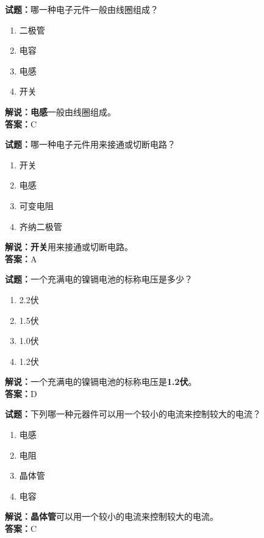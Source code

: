 \documentclass{ctexbook}
\begin{document}
\vspace{1em}

\textbf{试题：}哪一种电子元件一般由线圈组成？
\begin{enumerate}[leftmargin=3em]
  \item 二极管
  \item 电容
  \item 电感
  \item 开关
\end{enumerate}
\noindent\textbf{解说：}\textbf{电感}一般由线圈组成。\\\noindent\textbf{答案：}C

\vspace{1em}

\textbf{试题：}哪一种电子元件用来接通或切断电路？
\begin{enumerate}[leftmargin=3em]
  \item 开关
  \item 电感
  \item 可变电阻
  \item 齐纳二极管
\end{enumerate}
\noindent\textbf{解说：}\textbf{开关}用来接通或切断电路。\\\noindent\textbf{答案：}A

\vspace{1em}

\textbf{试题：}一个充满电的镍镉电池的标称电压是多少？
\begin{enumerate}[leftmargin=3em]
  \item 2.2伏
  \item 1.5伏
  \item 1.0伏
  \item 1.2伏
\end{enumerate}
\noindent\textbf{解说：}一个充满电的镍镉电池的标称电压是\textbf{1.2伏}。\\\noindent\textbf{答案：}D

\vspace{1em}

\textbf{试题：}下列哪一种元器件可以用一个较小的电流来控制较大的电流？
\begin{enumerate}[leftmargin=3em]
  \item 电感
  \item 电阻
  \item 晶体管
  \item 电容
\end{enumerate}
\noindent\textbf{解说：}\textbf{晶体管}可以用一个较小的电流来控制较大的电流。\\\noindent\textbf{答案：}C
\end{document}
